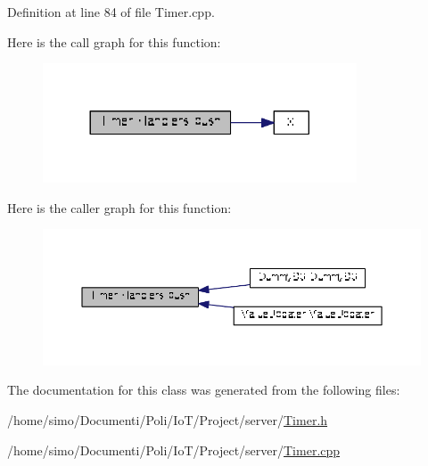 Definition at line 84 of file Timer.\+cpp.



Here is the call graph for this function\+:
\nopagebreak
\begin{figure}[H]
\begin{center}
\leavevmode
\includegraphics[width=264pt]{class_timer_1_1_handlers_a62acbf73c85217fdf91b557d85143ec0_cgraph}
\end{center}
\end{figure}




Here is the caller graph for this function\+:
\nopagebreak
\begin{figure}[H]
\begin{center}
\leavevmode
\includegraphics[width=350pt]{class_timer_1_1_handlers_a62acbf73c85217fdf91b557d85143ec0_icgraph}
\end{center}
\end{figure}




The documentation for this class was generated from the following files\+:\begin{DoxyCompactItemize}
\item 
/home/simo/\+Documenti/\+Poli/\+Io\+T/\+Project/server/\hyperlink{_timer_8h}{Timer.\+h}\item 
/home/simo/\+Documenti/\+Poli/\+Io\+T/\+Project/server/\hyperlink{_timer_8cpp}{Timer.\+cpp}\end{DoxyCompactItemize}

